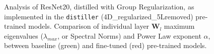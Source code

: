 \begin{figure}[H]
   \centering
   \quad
   \vspace{-3mm}
   \caption{
     Analysis of ResNet20, distilled with Group Regularization, as implemented in the \texttt{distiller} (4D\_regularized\_5Lremoved) pre-trained models.  
     Comparison of individual layer $\mathbf{W}_{l}$ maximum eigenvalues ($\lambda_{max}$, or Spectral Norms) and  
     Power Law exponent $\alpha$, between baseline (green) and fine-tuned (red)  pre-trained models.   
           }
   \label{fig:resnet204D5L}
\end{figure}

